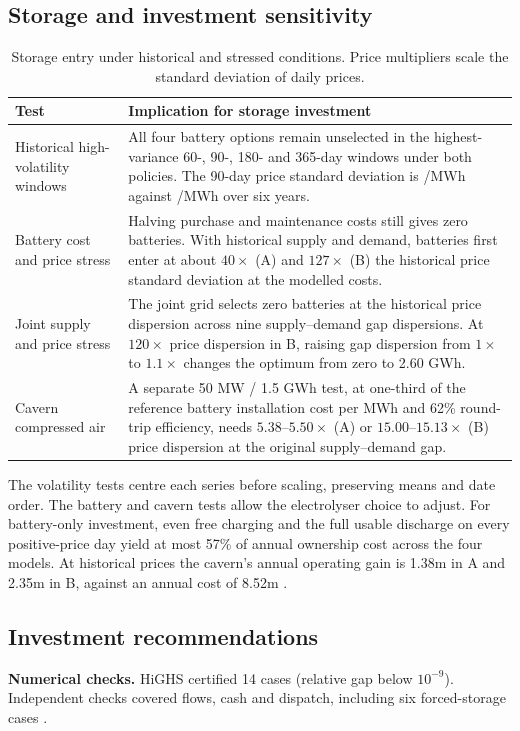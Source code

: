 \subsection{Storage and investment sensitivity}\label{sec:storage1}
\begin{table}[H]
\centering\small
\caption{Storage entry under historical and stressed conditions.
Price multipliers scale the standard deviation of daily prices.}
\label{tab:storage}
\begin{tabularx}{\linewidth}{@{}P{.35\linewidth}Y@{}}
\toprule
Test & Implication for storage investment \\
\midrule
Historical high-volatility windows &
All four battery options remain unselected in the highest-variance
60-, 90-, 180- and 365-day windows under both policies. The 90-day price
standard deviation is /MWh against /MWh over six years. \\
Battery cost and price stress &
Halving purchase and maintenance costs still gives zero batteries.
With historical supply and demand, batteries first enter at about
\(40\times\) (A) and \(127\times\) (B) the historical price standard
deviation at the modelled costs. \\
Joint supply and price stress &
The joint grid selects zero batteries at the historical price dispersion
across nine supply--demand gap dispersions. At \(120\times\) price
dispersion in B, raising gap dispersion from \(1\times\) to \(1.1\times\)
changes the optimum from zero to 2.60 GWh. \\
Cavern compressed air &
A separate 50 MW / 1.5 GWh test, at one-third of the reference battery
installation cost per MWh and 62\% round-trip efficiency, needs
\(5.38\)--\(5.50\times\) (A) or \(15.00\)--\(15.13\times\) (B) price
dispersion at the original supply--demand gap. \\
\bottomrule
\end{tabularx}
\end{table}
The volatility tests centre each series before scaling, preserving
means and date order. The battery and cavern tests allow the electrolyser
choice to adjust. For battery-only investment, even free charging and
the full usable discharge on every positive-price day yield at most
57\% of annual ownership cost across the four models. At historical
prices the cavern's annual operating
gain is \gbp 1.38m in A and \gbp 2.35m in B, against an annual cost of
\gbp 8.52m \cite{stress}.

\subsection{Investment recommendations}\label{sec:recommendations1}
\textbf{Numerical checks.} HiGHS certified 14 cases (relative gap below
\(10^{-9}\)). Independent checks covered flows, cash and dispatch,
including six forced-storage cases \cite{v6}.


